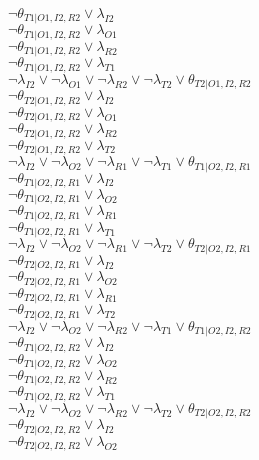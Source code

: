 $\neg\theta_{T1|O1,I2,R2} \vee \lambda_{I2}$\\
$\neg\theta_{T1|O1,I2,R2} \vee \lambda_{O1}$\\
$\neg\theta_{T1|O1,I2,R2} \vee \lambda_{R2}$\\
$\neg\theta_{T1|O1,I2,R2} \vee \lambda_{T1}$\\
$\neg\lambda_{I2} \vee \neg\lambda_{O1} \vee \neg\lambda_{R2} \vee \neg\lambda_{T2} \vee \theta_{T2|O1,I2,R2}$\\
$\neg\theta_{T2|O1,I2,R2} \vee \lambda_{I2}$\\
$\neg\theta_{T2|O1,I2,R2} \vee \lambda_{O1}$\\
$\neg\theta_{T2|O1,I2,R2} \vee \lambda_{R2}$\\
$\neg\theta_{T2|O1,I2,R2} \vee \lambda_{T2}$\\
$\neg\lambda_{I2} \vee \neg\lambda_{O2} \vee \neg\lambda_{R1} \vee \neg\lambda_{T1} \vee \theta_{T1|O2,I2,R1}$\\
$\neg\theta_{T1|O2,I2,R1} \vee \lambda_{I2}$\\
$\neg\theta_{T1|O2,I2,R1} \vee \lambda_{O2}$\\
$\neg\theta_{T1|O2,I2,R1} \vee \lambda_{R1}$\\
$\neg\theta_{T1|O2,I2,R1} \vee \lambda_{T1}$\\
$\neg\lambda_{I2} \vee \neg\lambda_{O2} \vee \neg\lambda_{R1} \vee \neg\lambda_{T2} \vee \theta_{T2|O2,I2,R1}$\\
$\neg\theta_{T2|O2,I2,R1} \vee \lambda_{I2}$\\
$\neg\theta_{T2|O2,I2,R1} \vee \lambda_{O2}$\\
$\neg\theta_{T2|O2,I2,R1} \vee \lambda_{R1}$\\
$\neg\theta_{T2|O2,I2,R1} \vee \lambda_{T2}$\\
$\neg\lambda_{I2} \vee \neg\lambda_{O2} \vee \neg\lambda_{R2} \vee \neg\lambda_{T1} \vee \theta_{T1|O2,I2,R2}$\\
$\neg\theta_{T1|O2,I2,R2} \vee \lambda_{I2}$\\
$\neg\theta_{T1|O2,I2,R2} \vee \lambda_{O2}$\\
$\neg\theta_{T1|O2,I2,R2} \vee \lambda_{R2}$\\
$\neg\theta_{T1|O2,I2,R2} \vee \lambda_{T1}$\\
$\neg\lambda_{I2} \vee \neg\lambda_{O2} \vee \neg\lambda_{R2} \vee \neg\lambda_{T2} \vee \theta_{T2|O2,I2,R2}$\\
$\neg\theta_{T2|O2,I2,R2} \vee \lambda_{I2}$\\
$\neg\theta_{T2|O2,I2,R2} \vee \lambda_{O2}$\\
